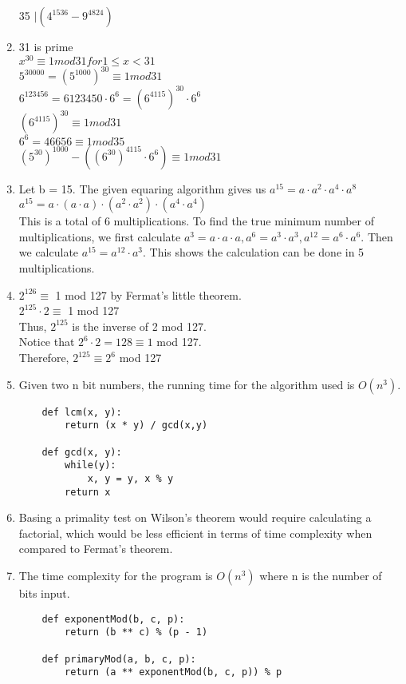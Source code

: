 \documentclass{article}
\begin{document}
\begin{enumerate}
	35 $\mid (4^{1536} - 9^{4824})$
	\item 31 is prime\\
	$x^{30} \equiv 1 mod 31 for 1 \leq x < 31$\\
	$5^{30000}  = (5^{1000})^{30} \equiv 1 mod 31$\\
	$6^{123456} = 6{123450} \cdot 6^{6} =  (6^{4115})^{30} \cdot 6^{6}$\\
	$(6^{4115})^{30} \equiv 1 mod 31$\\
	$6^{6} = 46656 \equiv 1 mod 35$\\
	$(5^{30})^{1000} - ((6^{30})^{4115} \cdot 6^{6}) \equiv 1 mod 31$
	\item Let b = 15. The given equaring algorithm gives us $a^{15} = a \cdot a^{2} \cdot a^{4} \cdot a^{8}$\\
	$a^{15} = a \cdot (a \cdot a) \cdot (a^{2} \cdot a^{2}) \cdot (a^{4} \cdot a^{4})$\\
	This is a total of 6 multiplications.
	To find the true minimum number of multiplications, we first calculate $a^{3} = a \cdot a \cdot a, a^{6} = a^{3} \cdot a^{3}, a^{12} = a^{6} \cdot a^{6}$.
	Then we calculate $a^{15} = a^{12} \cdot a^{3}.$ This shows the calculation can be done in 5 multiplications.
	\item $2^{126} \equiv$ 1 mod 127 by Fermat's little theorem.\\
	$2^{125} \cdot 2 \equiv$ 1 mod 127\\
	Thus, $2^{125}$ is the inverse of 2 mod 127.\\
	Notice that $2^{6} \cdot 2 = 128 \equiv 1$ mod 127.\\
	Therefore, $2^{125}  \equiv 2^{6}$ mod 127
	\item Given two n bit numbers, the running time for the algorithm used is $O(n^{3})$.
	\begin{lstlisting}
	def lcm(x, y):
		return (x * y) / gcd(x,y)

	def gcd(x, y):
		while(y):
			x, y = y, x % y
		return x
	\end{lstlisting}
	\item Basing a primality test on Wilson's theorem would require calculating a factorial, which would be less efficient in terms of time complexity when compared to Fermat's theorem.
	\item The time complexity for the program is $O(n^{3})$ where n is the number of bits input.
	\begin{lstlisting}
	def exponentMod(b, c, p):
		return (b ** c) % (p - 1)

	def primaryMod(a, b, c, p):
		return (a ** exponentMod(b, c, p)) % p
	\end{lstlisting}
\end{enumerate}
\end{document}
